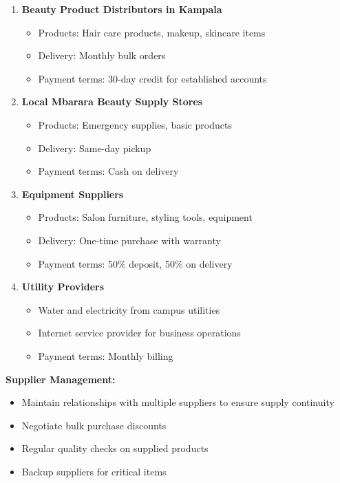 \documentclass[a4paper,12pt]{article}
\begin{document}
\begin{enumerate}[leftmargin=2em]
    \item \textbf{Beauty Product Distributors in Kampala}
    \begin{itemize}
        \item Products: Hair care products, makeup, skincare items
        \item Delivery: Monthly bulk orders
        \item Payment terms: 30-day credit for established accounts
    \end{itemize}
    
    \item \textbf{Local Mbarara Beauty Supply Stores}
    \begin{itemize}
        \item Products: Emergency supplies, basic products
        \item Delivery: Same-day pickup
        \item Payment terms: Cash on delivery
    \end{itemize}
    
    \item \textbf{Equipment Suppliers}
    \begin{itemize}
        \item Products: Salon furniture, styling tools, equipment
        \item Delivery: One-time purchase with warranty
        \item Payment terms: 50\% deposit, 50\% on delivery
    \end{itemize}
    
    \item \textbf{Utility Providers}
    \begin{itemize}
        \item Water and electricity from campus utilities
        \item Internet service provider for business operations
        \item Payment terms: Monthly billing
    \end{itemize}
\end{enumerate}

\textbf{Supplier Management:}
\begin{itemize}[leftmargin=2em]
    \item Maintain relationships with multiple suppliers to ensure supply continuity
    \item Negotiate bulk purchase discounts
    \item Regular quality checks on supplied products
    \item Backup suppliers for critical items
\end{itemize}
\end{document}
